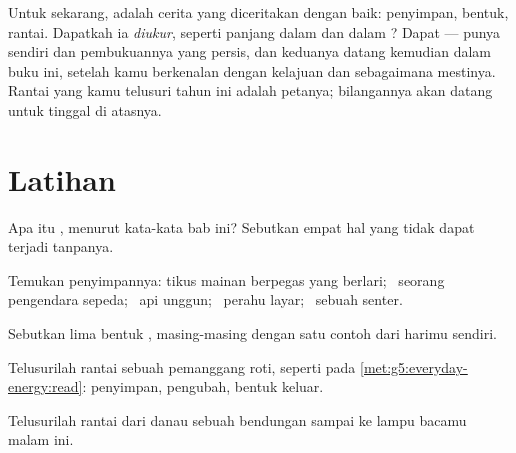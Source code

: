 \begin{remark}\label{rem:g5:everyday-energy:promise}
Untuk sekarang,  adalah cerita yang diceritakan dengan baik:
penyimpan, bentuk, rantai. Dapatkah ia \emph{diukur}, seperti panjang
dalam  dan  dalam ? Dapat ---  punya 
sendiri dan pembukuannya yang persis, dan keduanya datang kemudian
dalam buku ini, setelah kamu berkenalan dengan kelajuan dan 
sebagaimana mestinya. Rantai yang kamu telusuri tahun ini adalah
petanya; bilangannya akan datang untuk tinggal di atasnya.
\end{remark}

\section{Latihan}

\begin{exercise}[$\star$]\label{exo:g5:everyday-energy:1}
Apa itu , menurut kata-kata bab ini? Sebutkan empat hal yang
tidak dapat terjadi tanpanya.
\end{exercise}

\begin{exercise}[$\star$]\label{exo:g5:everyday-energy:2}
Temukan penyimpannya: tikus mainan berpegas yang berlari; \ seorang
pengendara sepeda; \ api unggun; \ perahu layar; \ sebuah senter.
\end{exercise}

\begin{exercise}[$\star$]\label{exo:g5:everyday-energy:3}
Sebutkan lima bentuk , masing-masing dengan satu contoh dari
harimu sendiri.
\end{exercise}

\begin{exercise}[$\star$]\label{exo:g5:everyday-energy:4}
Telusurilah rantai  sebuah pemanggang roti, seperti pada
\cref{met:g5:everyday-energy:read}: penyimpan, pengubah, bentuk keluar.
\end{exercise}

\begin{exercise}[$\star$]\label{exo:g5:everyday-energy:5}
Telusurilah rantai dari danau sebuah bendungan sampai ke lampu bacamu
malam ini.
\end{exercise}


